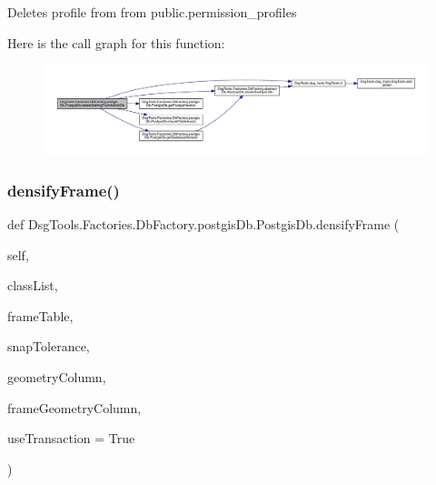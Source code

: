 \begin{DoxyVerb}Deletes profile from from public.permission_profiles
\end{DoxyVerb}
 Here is the call graph for this function\+:
\nopagebreak
\begin{figure}[H]
\begin{center}
\leavevmode
\includegraphics[width=350pt]{class_dsg_tools_1_1_factories_1_1_db_factory_1_1postgis_db_1_1_postgis_db_a3269189dc84caffd1f24865c7f868cdf_cgraph}
\end{center}
\end{figure}
\mbox{\label{class_dsg_tools_1_1_factories_1_1_db_factory_1_1postgis_db_1_1_postgis_db_a26155c70bff315e00e48b4b5dc21137c}} 
\subsubsection{\texorpdfstring{densify\+Frame()}{densifyFrame()}}
{\footnotesize\ttfamily def Dsg\+Tools.\+Factories.\+Db\+Factory.\+postgis\+Db.\+Postgis\+Db.\+densify\+Frame (\begin{DoxyParamCaption}\item[{}]{self,  }\item[{}]{class\+List,  }\item[{}]{frame\+Table,  }\item[{}]{snap\+Tolerance,  }\item[{}]{geometry\+Column,  }\item[{}]{frame\+Geometry\+Column,  }\item[{}]{use\+Transaction = {\ttfamily True} }\end{DoxyParamCaption})}

